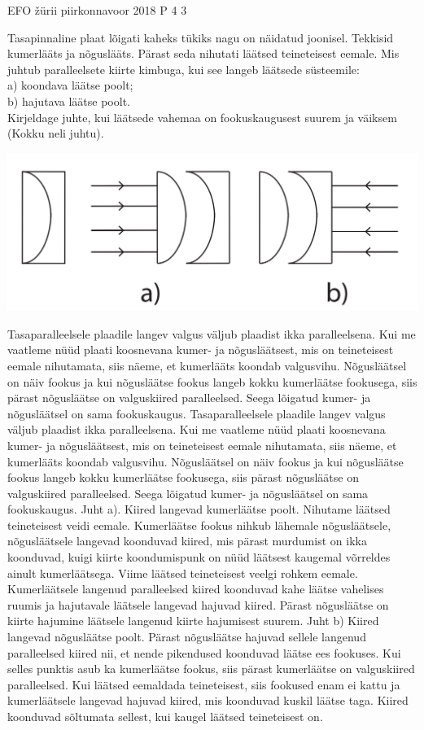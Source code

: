 {EFO žürii} %
{piirkonnavoor} %
{2018} %
{P 4} %
{3} %
{
\ifStatement
Tasapinnaline plaat lõigati kaheks tükiks nagu on näidatud joonisel. Tekkisid kumerlääts ja nõguslääts. Pärast seda nihutati läätsed teineteisest eemale. Mis juhtub paralleelsete kiirte kimbuga, kui see langeb läätsede süsteemile: \\
a) koondava läätse poolt; \\
b) hajutava läätse poolt. \\
Kirjeldage juhte, kui läätsede vahemaa on fookuskaugusest suurem ja väiksem (Kokku neli juhtu).
\ifSolution
\begin{center}
	\includegraphics[width=0.5\linewidth]{2018-v2p-04-yl.PNG}
\end{center}
\fi
\ifHint
Tasaparalleelsele plaadile langev valgus väljub plaadist ikka paralleelsena. Kui me vaatleme nüüd plaati koosnevana kumer- ja nõgusläätsest, mis on teineteisest eemale nihutamata, siis näeme, et kumerlääts koondab valgusvihu. Nõgusläätsel on näiv fookus ja kui nõgusläätse fookus langeb kokku kumerläätse fookusega, siis pärast nõgusläätse on valguskiired paralleelsed. Seega lõigatud kumer- ja nõgusläätsel on sama fookuskaugus.
\fi
\ifSolution
Tasaparalleelsele plaadile langev valgus väljub plaadist ikka paralleelsena. Kui me vaatleme nüüd plaati koosnevana kumer- ja nõgusläätsest, mis on teineteisest eemale nihutamata, siis näeme, et kumerlääts koondab valgusvihu. Nõgusläätsel on näiv fookus ja kui nõgusläätse fookus langeb kokku kumerläätse fookusega, siis pärast nõgusläätse on valguskiired paralleelsed. Seega lõigatud kumer- ja nõgusläätsel on sama fookuskaugus. Juht 
a). Kiired langevad kumerläätse poolt. Nihutame läätsed teineteisest veidi eemale. Kumerläätse fookus nihkub lähemale nõgusläätsele, nõgusläätsele langevad koonduvad kiired, mis pärast murdumist on ikka koonduvad, kuigi kiirte koondumispunk on nüüd läätsest kaugemal võrreldes ainult kumerläätsega. Viime läätsed teineteisest veelgi rohkem eemale. Kumerläätsele langenud paralleelsed kiired koonduvad kahe läätse vahelises ruumis ja hajutavale läätsele langevad hajuvad kiired. Pärast nõgusläätse on kiirte hajumine läätsele langenud kiirte hajumisest suurem. 
Juht 
b) Kiired langevad nõgusläätse poolt. Pärast nõgusläätse hajuvad sellele langenud paralleelsed kiired nii, et nende pikendused koonduvad läätse ees fookuses. Kui selles punktis asub ka kumerläätse fookus, siis pärast kumerläätse on valguskiired paralleelsed. Kui läätsed eemaldada teineteisest, siis fookused enam ei kattu ja kumerläätsele langevad hajuvad kiired, mis koonduvad kuskil läätse taga. Kiired koonduvad sõltumata sellest, kui kaugel läätsed teineteisest on.
\fi
}
